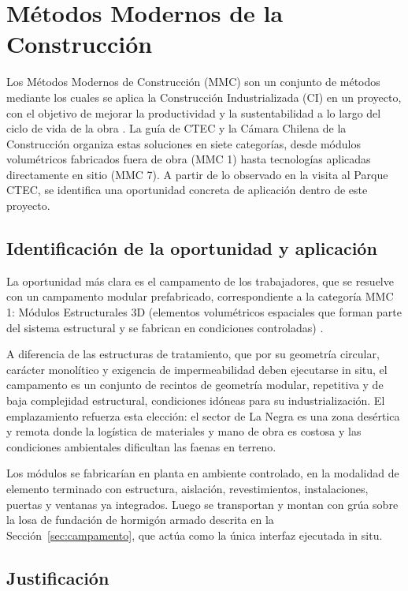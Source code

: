 \section{Métodos Modernos de la Construcción}

Los Métodos Modernos de Construcción (MMC) son un conjunto de métodos mediante los cuales se aplica la Construcción Industrializada (CI) en un proyecto, con el objetivo de mejorar la productividad y la sustentabilidad a lo largo del ciclo de vida de la obra \cite{GuiaMMC}. La guía de CTEC y la Cámara Chilena de la Construcción organiza estas soluciones en siete categorías, desde módulos volumétricos fabricados fuera de obra (MMC 1) hasta tecnologías aplicadas directamente en sitio (MMC 7). A partir de lo observado en la visita al Parque CTEC, se identifica una oportunidad concreta de aplicación dentro de este proyecto.

\subsection{Identificación de la oportunidad y aplicación}

La oportunidad más clara es el campamento de los trabajadores, que se resuelve con un campamento modular prefabricado, correspondiente a la categoría MMC 1: Módulos Estructurales 3D (elementos volumétricos espaciales que forman parte del sistema estructural y se fabrican en condiciones controladas) \cite{GuiaMMC}.

A diferencia de las estructuras de tratamiento, que por su geometría circular, carácter monolítico y exigencia de impermeabilidad deben ejecutarse in situ, el campamento es un conjunto de recintos de geometría modular, repetitiva y de baja complejidad estructural, condiciones idóneas para su industrialización. El emplazamiento refuerza esta elección: el sector de La Negra es una zona desértica y remota donde la logística de materiales y mano de obra es costosa y las condiciones ambientales dificultan las faenas en terreno.

Los módulos se fabricarían en planta en ambiente controlado, en la modalidad de elemento terminado con estructura, aislación, revestimientos, instalaciones, puertas y ventanas ya integrados. Luego se transportan y montan con grúa sobre la losa de fundación de hormigón armado descrita en la Sección~\ref{sec:campamento}, que actúa como la única interfaz ejecutada in situ.
\subsection{Justificación}

